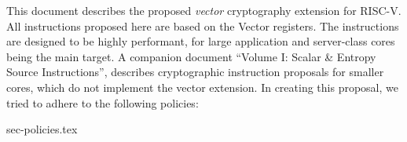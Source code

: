 
This document describes the proposed {\em vector} cryptography
extension for RISC-V.
All instructions proposed here are based on the Vector registers.
The instructions are designed to be highly performant, for large
application and server-class cores being the main target.
A companion document ``Volume I: Scalar \& Entropy Source Instructions'',
describes
cryptographic instruction proposals for smaller cores, which do not
implement the vector extension.
In creating this proposal, we tried to adhere to the following
policies:

{sec-policies.tex}
